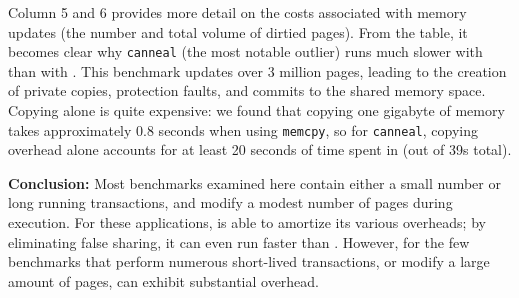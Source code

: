 Column 5 and 6 provides more detail on the costs associated with
memory updates (the number and total volume of dirtied pages). From
the table, it becomes clear why \texttt{canneal} (the most notable
outlier) runs much slower with \dthreads{} than with \pthreads{}. This benchmark
updates over 3 million pages, leading to the creation of
private copies, protection faults, and commits to the shared memory
space. Copying alone is quite expensive: we found that copying one
gigabyte of memory takes approximately 0.8 seconds when
using \texttt{memcpy}, so for \texttt{canneal}, copying overhead alone
accounts for at least 20 seconds of time spent in \dthreads{} (out of
39s total).

\textbf{Conclusion: }
Most benchmarks examined here contain either a small number or long
running transactions, and modify a modest number of pages during
execution. For these applications, \dthreads{} is able to amortize its
various overheads; by eliminating false sharing, it can even run faster than
\pthreads{}. However, for the few benchmarks that perform numerous short-lived
transactions, or modify a large amount of pages, \dthreads{} can
exhibit substantial overhead.


